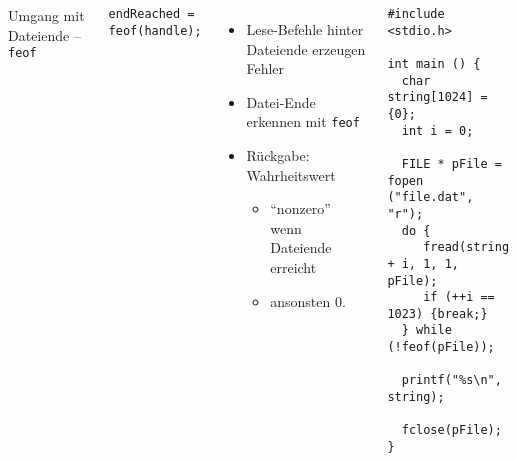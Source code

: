 \begin{frame}[fragile]
%
\begin{columns}[T]
\begin{Large}
Umgang mit Dateiende -- \texttt{feof}
\vspace{10pt}
\end{Large}
%
\begin{codebox}[Syntax]
\begin{verbatim}
endReached = feof(handle);
\end{verbatim}
\end{codebox}
%
\begin{itemize}
\item Lese-Befehle hinter Dateiende erzeugen Fehler
\item Datei-Ende erkennen mit \texttt{feof}
\item Rückgabe: Wahrheitswert
	\begin{itemize}
	\item \enquote{nonzero} wenn Dateiende erreicht
	\item ansonsten 0.
	\end{itemize}
\end{itemize}
%
\begin{codebox}
\begin{verbatim}
#include <stdio.h>

int main () {
  char string[1024] = {0};
  int i = 0;
  
  FILE * pFile = fopen ("file.dat", "r");
  do {
     fread(string + i, 1, 1, pFile);
     if (++i == 1023) {break;}
  } while (!feof(pFile));

  printf("%s\n", string);  
  
  fclose(pFile);
}
\end{verbatim}
\end{codebox}
\end{columns}
%
\end{frame}


